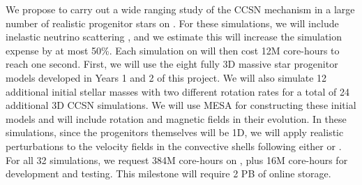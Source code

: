 We propose to carry out a wide ranging study of the CCSN mechanism in a large number of realistic progenitor stars on \aurora.
For these simulations, we will include inelastic neutrino scattering \citep{OConnor:2015, Burrows:2016}, and we estimate this will increase the simulation expense by at most 50\%.
Each simulation on \aurora will then cost 12M core-hours to reach one second.
First, we will use the eight fully 3D massive star progenitor models developed in Years 1 and 2 of this project.
We will also simulate 12 additional initial stellar masses with two different rotation rates for a total of 24 additional 3D CCSN simulations.
We will use MESA for constructing these initial models and will include rotation and magnetic fields in their evolution.
In these simulations, since the progenitors themselves will be 1D, we will apply realistic perturbations to the velocity fields in the convective shells following either \citet{Muller:2015} or \citet{Chatzopoulos:2014}.
For all 32 simulations, we request 384M core-hours on \aurora, plus 16M core-hours for development and testing.
This milestone will require 2 PB of online storage.


%
%


